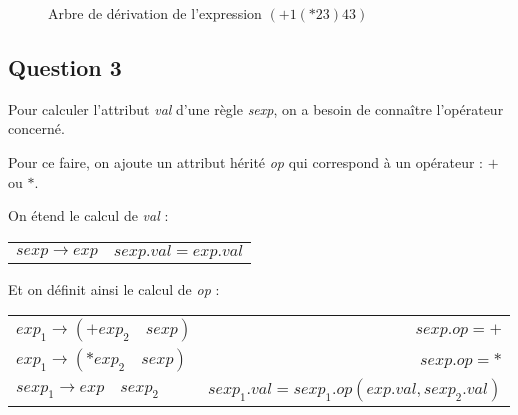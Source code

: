 \documentclass[a4paper, 11pt]{article}
\begin{document}
	\begin{figure}[h!]
		\centering
		\caption{Arbre de dérivation de l'expression $(+1(*23)43)$}
		\label{fig:ast}
	\end{figure}
	
\subsection{Question 3}

Pour calculer l'attribut \textit{val} d'une règle \textit{sexp}, on a besoin de 
connaître l'opérateur concerné.

Pour ce faire, on ajoute un attribut hérité \textit{op} qui correspond à un 
opérateur : $+$ ou $*$.

On étend le calcul de \textit{val} :
\begin{center}
	\begin{tabular}{l | r}
		$\mathit{sexp} \rightarrow \mathit{exp}$ & $\mathit{sexp.val} = 
		\mathit{exp.val}$\\
		\end{tabular}
\end{center}

Et on définit ainsi le calcul de \textit{op} :
\begin{center}
	\begin{tabular}{l | r}
		$\mathit{exp}_1 \rightarrow (+ \mathit{exp}_2\quad \mathit{sexp}) $&$ 
		\mathit{sexp.op}= + $\\
		$\mathit{exp}_1 \rightarrow (*\mathit{exp}_2\quad \mathit{sexp}) $&$ 
		\mathit{sexp.op}= * $\\
		$\mathit{sexp}_1 \rightarrow \mathit{exp}\quad\mathit{sexp}_2$ & 
		$\mathit{sexp_1.val} = \mathit{sexp_1.op}(\mathit{exp.val}, 
		\mathit{sexp_2.val})$\\
	\end{tabular}
\end{center}
\end{document}
